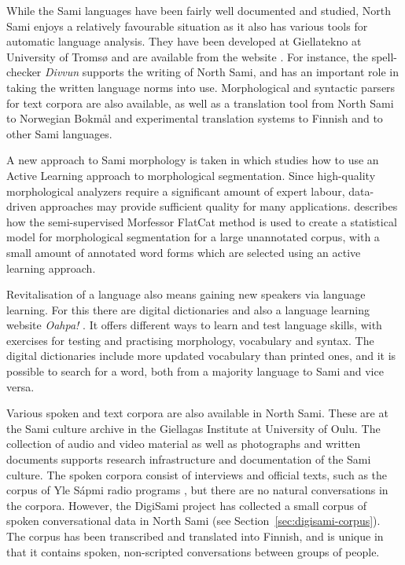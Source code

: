 \documentclass[runningheads,a4paper]{llncs}
\begin{document}
While the Sami languages have been fairly well documented and studied, North Sami enjoys a relatively favourable situation as it also has various tools for automatic language analysis. They have been developed at Giellatekno at University of Troms{\o} and are available from the website \cite{Tromso:analyzers}. For instance, the spell-checker \textit{Divvun} supports the writing of North Sami, and has an important role in taking the written language norms into use. Morphological and syntactic parsers for text corpora are also available, as well as a translation tool from North Sami to Norwegian Bokm\r{a}l and experimental translation systems to Finnish and to other Sami languages.

A new approach to Sami morphology is taken in \cite{Groenroos:ea:15} which studies how to use an Active Learning approach to morphological segmentation. Since high-quality morphological analyzers require a significant amount of expert labour, data-driven approaches may provide sufficient quality for many applications. \cite{Groenroos:ea:15} describes how the semi-supervised Morfessor FlatCat method is used to create a statistical model for morphological segmentation for a large unannotated corpus, with a small amount of annotated word forms which are selected using an active learning approach.

Revitalisation of a language also means gaining new speakers via language learning. For this there are digital dictionaries and also a language learning website \textit{Oahpa!} \cite{Tromso:oahpa}. It offers different ways to learn and test language skills, with exercises for testing and practising morphology, vocabulary and syntax. The digital dictionaries \cite{Tromso:dicts} include more updated vocabulary than printed ones, and it is possible to search for a word, both from a majority language to Sami and vice versa.

Various spoken and text corpora are also available in North Sami. These are at the Sami culture archive \cite{Oulu:archive} in the Giellagas Institute at University of Oulu. The collection of audio and video material as well as photographs and written documents supports research infrastructure and documentation of the Sami culture. The spoken corpora consist of interviews and official texts, such as the corpus of Yle
S\'apmi radio programs \cite{Oulu:aanitteet}, but there are no natural conversations in the corpora. However, the DigiSami project has collected a small corpus of spoken conversational data in North Sami (see
Section~\ref{sec:digisami-corpus}). The corpus has been transcribed and translated into Finnish, and is unique in that it contains spoken, non-scripted conversations between groups of people.
\end{document}
